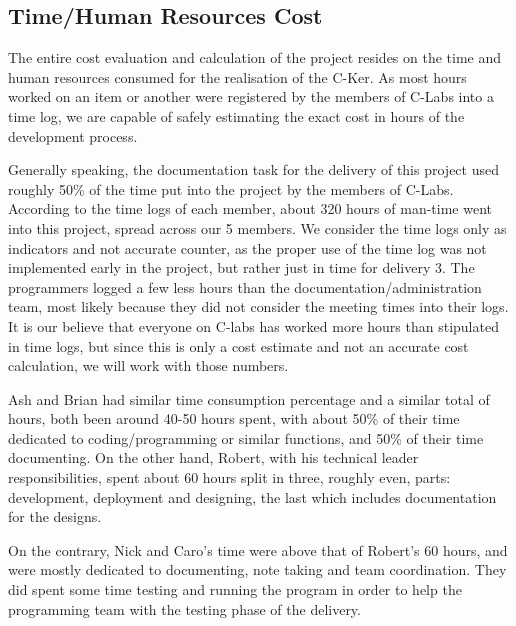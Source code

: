 \documentclass[12pt]{article}
\begin{document}
\subsection{Time/Human Resources Cost}
	The entire cost evaluation and calculation of the project resides on the time and human resources consumed for the realisation of the C-Ker.  As most hours worked on an item or another were registered by the members of C-Labs into a time log, we are capable of safely estimating the exact cost in hours of the development process. \par
	Generally speaking, the documentation task for the delivery of this project used roughly 50\% of the time put into the project by the members of C-Labs. According to the time logs of each member, about 320 hours of man-time went into this project, spread across our 5 members. We consider the time logs only as indicators and not accurate counter, as the proper use of the time log was not implemented early in the project, but rather just in time for delivery 3. The programmers logged a few less hours than the documentation/administration team, most likely because they did not consider the meeting times into their logs. It is our believe that everyone on C-labs has worked more hours than stipulated in time logs, but since this is only a cost estimate and not an accurate cost calculation, we will work with those numbers.\par
	Ash and Brian had similar time consumption percentage and a similar total of hours, both been around 40-50 hours spent, with about 50\% of their time dedicated to coding/programming or similar functions, and 50\% of their time documenting. On the other hand, Robert, with his technical leader responsibilities, spent about 60 hours split in three, roughly even, parts: development, deployment and designing, the last which includes documentation for the designs.\par
	On the contrary, Nick and Caro’s time were above that of Robert’s 60 hours, and were mostly dedicated to documenting, note taking and team coordination. They did spent some time testing and running the program in order to help the programming team with the testing phase of the delivery.
\end{document}

